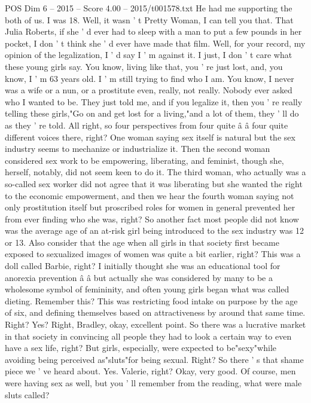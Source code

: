 \begin{textsample}{POS Dim 6 – 2015 – Score 4.00 – 2015/t001578.txt}
He had me supporting the both of us.
I was 18.
Well, it wasn ' t Pretty Woman, I can tell you that.
That Julia Roberts, if she ' d ever had to sleep with a man to put a few pounds in her pocket, I don ' t think she ' d ever have made that film.
Well, for your record, my opinion of the legalization, I ' d say I ' m against it.
I just, I don ' t care what these young girls say.
You know, living like that, you ' re just lost, and, you know, I ' m 63 years old.
I ' m still trying to find who I am.
You know, I never was a wife or a nun, or a prostitute even, really, not really.
Nobody ever asked who I wanted to be.
They just told me, and if you legalize it, then you ' re really telling these girls,"Go on and get lost for a living,"and a lot of them, they ' ll do as they ' re told.
All right, so four perspectives from four quite â â four quite different voices there, right?
One woman saying sex itself is natural but the sex industry seems to mechanize or industrialize it.
Then the second woman considered sex work to be empowering, liberating, and feminist, though she, herself, notably, did not seem keen to do it.
The third woman, who actually was a so-called sex worker did not agree that it was liberating but she wanted the right to the economic empowerment, and then we hear the fourth woman saying not only prostitution itself but proscribed roles for women in general prevented her from ever finding who she was, right?
So another fact most people did not know was the average age of an at-risk girl being introduced to the sex industry was 12 or 13.
Also consider that the age when all girls in that society first became exposed to sexualized images of women was quite a bit earlier, right?
This was a doll called Barbie, right?
I initially thought she was an educational tool for anorexia prevention â â but actually she was considered by many to be a wholesome symbol of femininity, and often young girls began what was called dieting.
Remember this?
This was restricting food intake on purpose by the age of six, and defining themselves based on attractiveness by around that same time.
Right?
Yes?
Right, Bradley, okay, excellent point.
So there was a lucrative market in that society in convincing all people they had to look a certain way to even have a sex life, right?
But girls, especially, were expected to be"sexy"while avoiding being perceived as"sluts"for being sexual.
Right?
So there ' s that shame piece we ' ve heard about.
Yes.
Valerie, right?
Okay, very good.
Of course, men were having sex as well, but you ' ll remember from the reading, what were male sluts called?

\end{textsample}
